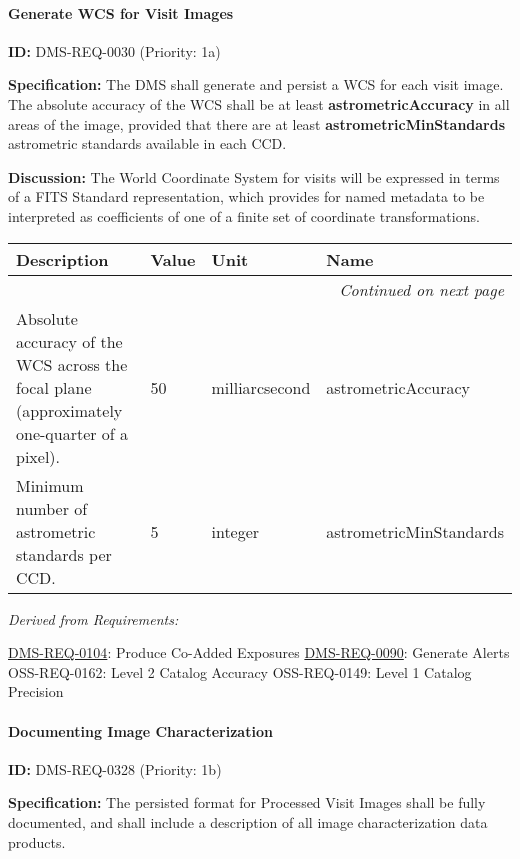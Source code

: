 \documentclass[SE,toc,lsstdraft]{lsstdoc}
\makeatletter
\newcommand{\paramname}[1]{\hspace{0pt}#1}
\newcommand{\unitname}[1]{\hspace{0pt}#1}
\newenvironment{parameters}[0]{%
\setlength\LTleft{0pt}
\setlength\LTright{\fill}
\begin{small}
\begin{longtable}[]{|p{0.49\textwidth}|l|p{0.6in}|p{1.70in}@{}|}

\hline \textbf{Description} & \textbf{Value} & \textbf{Unit} & \textbf{Name} \\ \hline
\endhead

\hline \multicolumn{4}{r}{\emph{Continued on next page}} \\
\endfoot

\hline\hline
\endlastfoot
}{%
\hline
\end{longtable}
\end{small}
}
\makeatother
\begin{document}
\paragraph{Generate WCS for Visit Images}\hfill  %

\label{DMS-REQ-0030}
\textbf{ID:} DMS-REQ-0030 (Priority: 1a)

\textbf{Specification:} The DMS shall generate and persist a WCS for each visit image.  The absolute accuracy of the WCS shall be at least \textbf{astrometricAccuracy} in all areas of the image, provided that there are at least \textbf{astrometricMinStandards} astrometric standards available in each CCD.

\textbf{Discussion:} The World Coordinate System for visits will be expressed in terms of a FITS Standard representation, which provides for named metadata to be interpreted as coefficients of one of a finite set of coordinate transformations.

\begin{parameters}
Absolute accuracy of the WCS across the focal plane (approximately one-quarter of a pixel).
&
50
&
\unitname{%
milliarcsecond
}
&
\paramname{%
astrometricAccuracy
} \\\hline
Minimum number of astrometric standards per CCD.
&
5
&
\unitname{%
integer
}
&
\paramname{%
astrometricMinStandards
} \\\hline
\end{parameters}

\emph{Derived from Requirements:}

\hyperref[DMS-REQ-0104]{DMS-REQ-0104}:
Produce Co-Added Exposures \newline
\hyperref[DMS-REQ-0090]{DMS-REQ-0090}:
Generate Alerts \newline
OSS-REQ-0162:
Level 2 Catalog Accuracy \newline
OSS-REQ-0149:
Level 1 Catalog Precision \newline

\paragraph{Documenting Image Characterization}\hfill  %

\label{DMS-REQ-0328}
\textbf{ID:} DMS-REQ-0328 (Priority: 1b)

\textbf{Specification:} The persisted format for Processed Visit Images shall be fully documented, and shall include a description of all image characterization data products.
\end{document}

